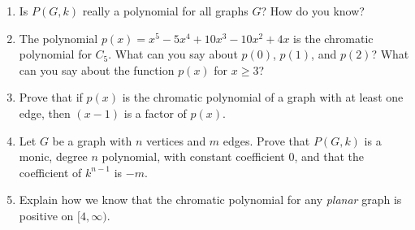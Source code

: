 \documentclass[12pt]{article}
\begin{document}
\begin{enumerate}
  \item Is $P(G,k)$ really a polynomial for all graphs $G$?  How do you know?
  \vfill

  \item The polynomial $p(x) = x^5 - 5 x^4 + 10 x^3 - 10 x^2 + 4 x$ is the chromatic polynomial for $C_5$.  What can you say about $p(0)$, $p(1)$, and $p(2)$?  What can you say about the function $p(x)$ for $x \ge 3$?
  \vfill
  \item Prove that if $p(x)$ is the chromatic polynomial of a graph with at least one edge, then $(x-1)$ is a factor of $p(x)$.
  \vfill
  \item Let $G$ be a graph with $n$ vertices and $m$ edges.  Prove that $P(G,k)$ is a monic, degree $n$ polynomial, with constant coefficient 0, and that the coefficient of $k^{n-1}$ is $-m$.
  \vfill
  \item Explain how we know that the chromatic polynomial for any \emph{planar} graph is positive on $[4,\infty)$.
\end{enumerate}
\end{document}
